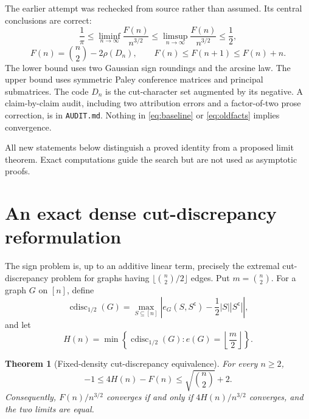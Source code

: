 \documentclass[11pt]{article}
\newtheorem{theorem}{Theorem}
\begin{document}
The earlier attempt was rechecked from source rather than assumed.  Its
central conclusions are correct:
\begin{equation}
 \frac1\pi
 \le \liminf_{n\to\infty}\frac{F(n)}{n^{3/2}}
 \le \limsup_{n\to\infty}\frac{F(n)}{n^{3/2}}
 \le\frac12,
 \label{eq:baseline}
\end{equation}
\begin{equation}
 F(n)=\binom n2-2\rho(D_n),
 \qquad
 F(n)\le F(n+1)\le F(n)+n.
 \label{eq:oldfacts}
\end{equation}
The lower bound uses two Gaussian sign roundings and the arcsine law.  The
upper bound uses symmetric Paley conference matrices and principal
submatrices.  The code \(D_n\) is the cut-character set augmented by its
negative.  A claim-by-claim audit, including two attribution errors and a
factor-of-two prose correction, is in \texttt{AUDIT.md}.  Nothing in
\eqref{eq:baseline} or \eqref{eq:oldfacts} implies convergence.

All new statements below distinguish a proved identity from a proposed limit
theorem.  Exact computations guide the search but are not used as asymptotic
proofs.

\section{An exact dense cut-discrepancy reformulation}

The sign problem is, up to an additive linear term, precisely the extremal
cut-discrepancy problem for graphs having
$\lfloor\binom n2/2\rfloor$ edges.  Put
$m=\binom n2$.  For a graph $G$ on $[n]$, define
\[
 \operatorname{cdisc}_{1/2}(G)
 =\max_{S\subseteq[n]}
 \left|e_G(S,S^{\mathsf c})-\frac12|S||S^{\mathsf c}|\right|,
\]
and let
\[
 H(n)=\min\left\{\operatorname{cdisc}_{1/2}(G):
                  e(G)=\left\lfloor\frac m2\right\rfloor\right\}.
\]

\begin{theorem}[Fixed-density cut-discrepancy equivalence]
\label{thm:cut-discrepancy}
For every $n\ge2$,
\begin{equation}
 -1\le 4H(n)-F(n)\le\sqrt{\binom n2}+2.
 \label{eq:cut-discrepancy-equivalence}
\end{equation}
Consequently, $F(n)/n^{3/2}$ converges if and only if
$4H(n)/n^{3/2}$ converges, and the two limits are equal.
\end{theorem}
\end{document}
